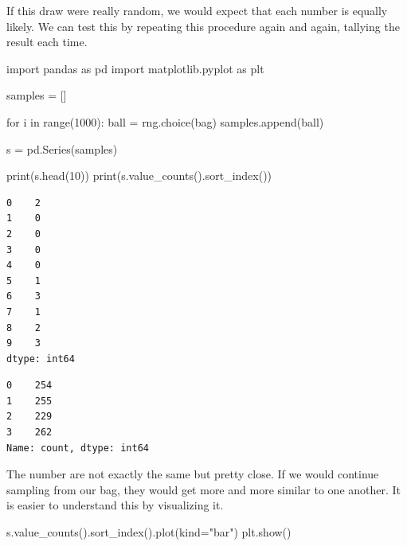 \documentclass[
  a4paperpaper,
  ,captions=tableheading
]{scrbook}
\newenvironment{Shaded}{\begin{snugshade}}{\end{snugshade}}
\newcommand{\BuiltInTok}[1]{\textcolor[rgb]{0.00,0.23,0.31}{#1}}
\newcommand{\ControlFlowTok}[1]{\textcolor[rgb]{0.00,0.23,0.31}{#1}}
\newcommand{\DecValTok}[1]{\textcolor[rgb]{0.68,0.00,0.00}{#1}}
\newcommand{\ImportTok}[1]{\textcolor[rgb]{0.00,0.46,0.62}{#1}}
\newcommand{\KeywordTok}[1]{\textcolor[rgb]{0.00,0.23,0.31}{#1}}
\newcommand{\NormalTok}[1]{\textcolor[rgb]{0.00,0.23,0.31}{#1}}
\newcommand{\OperatorTok}[1]{\textcolor[rgb]{0.37,0.37,0.37}{#1}}
\newcommand{\StringTok}[1]{\textcolor[rgb]{0.13,0.47,0.30}{#1}}
\begin{document}
If this draw were really random, we would expect that each number is
equally likely. We can test this by repeating this procedure again and
again, tallying the result each time.

\begin{Shaded}
\begin{Highlighting}[]
\ImportTok{import}\NormalTok{ pandas }\ImportTok{as}\NormalTok{ pd}
\ImportTok{import}\NormalTok{ matplotlib.pyplot }\ImportTok{as}\NormalTok{ plt}

\NormalTok{samples }\OperatorTok{=}\NormalTok{ []}

\ControlFlowTok{for}\NormalTok{ i }\KeywordTok{in} \BuiltInTok{range}\NormalTok{(}\DecValTok{1000}\NormalTok{):}
\NormalTok{    ball }\OperatorTok{=}\NormalTok{ rng.choice(bag)}
\NormalTok{    samples.append(ball)}

\NormalTok{s }\OperatorTok{=}\NormalTok{ pd.Series(samples)}

\BuiltInTok{print}\NormalTok{(s.head(}\DecValTok{10}\NormalTok{))}
\BuiltInTok{print}\NormalTok{(s.value\_counts().sort\_index())}
\end{Highlighting}
\end{Shaded}

\begin{verbatim}
0    2
1    0
2    0
3    0
4    0
5    1
6    3
7    1
8    2
9    3
dtype: int64
\end{verbatim}

\begin{verbatim}
0    254
1    255
2    229
3    262
Name: count, dtype: int64
\end{verbatim}

The number are not exactly the same but pretty close. If we would
continue sampling from our bag, they would get more and more similar to
one another. It is easier to understand this by visualizing it.

\begin{Shaded}
\begin{Highlighting}[]
\NormalTok{s.value\_counts().sort\_index().plot(kind}\OperatorTok{=}\StringTok{"bar"}\NormalTok{)}
\NormalTok{plt.show()}
\end{Highlighting}
\end{Shaded}
\end{document}
